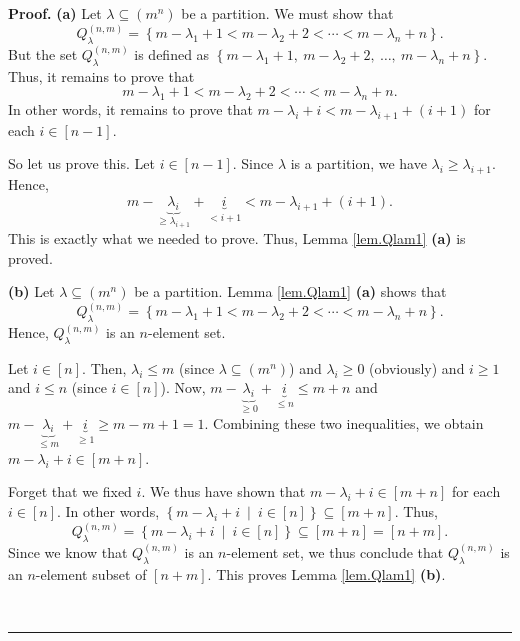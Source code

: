 \documentclass[numbers=enddot,12pt,final,onecolumn,notitlepage]{scrartcl}%
\theoremstyle{definition}
\newenvironment{proof}[1][Proof]{\noindent\textbf{#1.} }{\ \rule{0.5em}{0.5em}}
\begin{document}
\begin{enumerate}
\begin{proof}
\textbf{(a)} Let $\lambda\subseteq\left(  m^{n}\right)  $ be a partition. We
must show that%
\[
Q_{\lambda}^{\left(  n,m\right)  }=\left\{  m-\lambda_{1}+1<m-\lambda
_{2}+2<\cdots<m-\lambda_{n}+n\right\}  .
\]
But the set $Q_{\lambda}^{\left(  n,m\right)  }$ is defined as $\left\{
m-\lambda_{1}+1,\ m-\lambda_{2}+2,\ \ldots,\ m-\lambda_{n}+n\right\}  $. Thus,
it remains to prove that
\[
m-\lambda_{1}+1<m-\lambda_{2}+2<\cdots<m-\lambda_{n}+n.
\]
In other words, it remains to prove that $m-\lambda_{i}+i<m-\lambda
_{i+1}+\left(  i+1\right)  $ for each $i\in\left[  n-1\right]  $.

So let us prove this. Let $i\in\left[  n-1\right]  $. Since $\lambda$ is a
partition, we have $\lambda_{i}\geq\lambda_{i+1}$. Hence,%
\[
m-\underbrace{\lambda_{i}}_{\geq\lambda_{i+1}}+\underbrace{i}_{<i+1}%
<m-\lambda_{i+1}+\left(  i+1\right)  .
\]
This is exactly what we needed to prove. Thus, Lemma \ref{lem.Qlam1}
\textbf{(a)} is proved. \medskip

\textbf{(b)} Let $\lambda\subseteq\left(  m^{n}\right)  $ be a partition.
Lemma \ref{lem.Qlam1} \textbf{(a)} shows that%
\[
Q_{\lambda}^{\left(  n,m\right)  }=\left\{  m-\lambda_{1}+1<m-\lambda
_{2}+2<\cdots<m-\lambda_{n}+n\right\}  .
\]
Hence, $Q_{\lambda}^{\left(  n,m\right)  }$ is an $n$-element set.

Let $i\in\left[  n\right]  $. Then, $\lambda_{i}\leq m$ (since $\lambda
\subseteq\left(  m^{n}\right)  $) and $\lambda_{i}\geq0$ (obviously) and
$i\geq1$ and $i\leq n$ (since $i\in\left[  n\right]  $). Now,
$m-\underbrace{\lambda_{i}}_{\geq0}+\underbrace{i}_{\leq n}\leq m+n$ and
$m-\underbrace{\lambda_{i}}_{\leq m}+\underbrace{i}_{\geq1}\geq m-m+1=1$.
Combining these two inequalities, we obtain $m-\lambda_{i}+i\in\left[
m+n\right]  $.

Forget that we fixed $i$. We thus have shown that $m-\lambda_{i}+i\in\left[
m+n\right]  $ for each $i\in\left[  n\right]  $. In other words, $\left\{
m-\lambda_{i}+i\ \mid\ i\in\left[  n\right]  \right\}  \subseteq\left[
m+n\right]  $. Thus,
\[
Q_{\lambda}^{\left(  n,m\right)  }=\left\{  m-\lambda_{i}+i\ \mid\ i\in\left[
n\right]  \right\}  \subseteq\left[  m+n\right]  =\left[  n+m\right]  .
\]
Since we know that $Q_{\lambda}^{\left(  n,m\right)  }$ is an $n$-element set,
we thus conclude that $Q_{\lambda}^{\left(  n,m\right)  }$ is an $n$-element
subset of $\left[  n+m\right]  $. This proves Lemma \ref{lem.Qlam1}
\textbf{(b)}. \medskip


\end{proof}
\end{enumerate}
\end{document}
